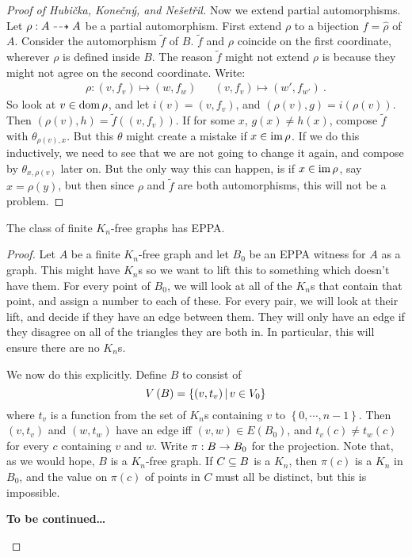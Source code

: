 \documentclass{amsart}
\begin{document}
\begin{proof}[Proof of Hubi\v{c}ka, Kone\v{c}n\'{y}, and Ne\v{s}et\v{r}il]
Now we extend partial automorphisms. Let $\rho: A\dashrightarrow A$ be a partial automorphism.
First extend $\rho$ to a bijection $f = \hat \rho$ of $A$. 
Consider the automorphism $\tilde f$ of $B$.
$\tilde f$ and $\rho$ coincide on the first coordinate, wherever $\rho$ is defined inside
$B$. The reason $\tilde f$ might not extend $\rho$ is because they might not agree on the
second coordinate. Write:
\begin{align}
\rho: \left( v , f_v \right)  \mapsto \left( w , f_w \right) &&
\left( v , f_v \right) \mapsto \left( w' , f_{w'} \right) \ .
\end{align}
So look at $v\in \operatorname{dom} \rho$, and let $i\left( v \right) = \left( v , f_v \right)$, 
and $\left( \rho\left( v \right) , g \right) = i\left( \rho\left( v \right) \right)$.
Then $\left( \rho\left( v \right) , h \right) = \tilde f\left( \left( v , f_v \right)
\right)$. 
If for some $x$, $g\left( x \right) \neq h\left( x \right)$, 
compose $\tilde f$ with $\theta_{\rho\left( v \right) , x}$.
But this $\theta$ might create a mistake if $x\in \operatorname{im}\rho$.
If we do this inductively, we need to see that we are not going to change it again,
and compose by $\theta_{x,\rho\left( v \right)}$ later on. But the only way this can
happen, is if $x\in \operatorname{im}\rho$, say $x = \rho\left( y \right)$, but then since $\rho$ and
$\tilde f$ are both automorphisms, this will not be a problem.
\end{proof}

\begin{thm}
The class of finite $K_n$-free graphs has EPPA.
\end{thm}

\begin{proof}
Let $A$ be a finite $K_n$-free graph and let $B_0$ be an EPPA witness for $A$ as a graph.
This might have $K_n$s so we want to lift this to something which doesn't have them.
For every point of $B_0$, we will look at all of the $K_n$s that contain that
point, and assign a number to each of these.
For every pair, we will look at their lift, and decide if they have an edge between them.
They will only have an edge if they disagree on all of the triangles they are both in.
In particular, this will ensure there are no $K_n$s.

We now do this explicitly. Define $B$ to consist of
\begin{equation}
V\left( B \right) = \left\{ \left( v,t_v \right) \, \middle\vert \, v\in V_0 \right\}
\end{equation}
where $t_v$ is a function from the set of $K_n$s containing $v$ to $\left\{ 0, \cdots ,
n-1\right\}$. Then $\left( v , t_v \right)$ and $\left( w , t_w \right)$ have an edge iff
$\left( v,w \right)\in E\left( B_0 \right)$, and $t_v\left( c \right) \neq t_w\left( c
\right)$ for every $c$ containing $v$ and $w$. Write $\pi: B\rightarrow B_0$ for the
projection. Note that, as we would hope, $B$ is a
$K_n$-free graph. If $C\subseteq B$ is a $K_n$, then $\pi\left( c \right)$ is a $K_n$ in
$B_0$, and the value on $\pi\left( c \right)$ of points in $C$ must all be distinct, but
this is impossible.
\begin{center}
\textbf{To be continued\ldots}
\end{center}
\end{proof}
\end{document}

